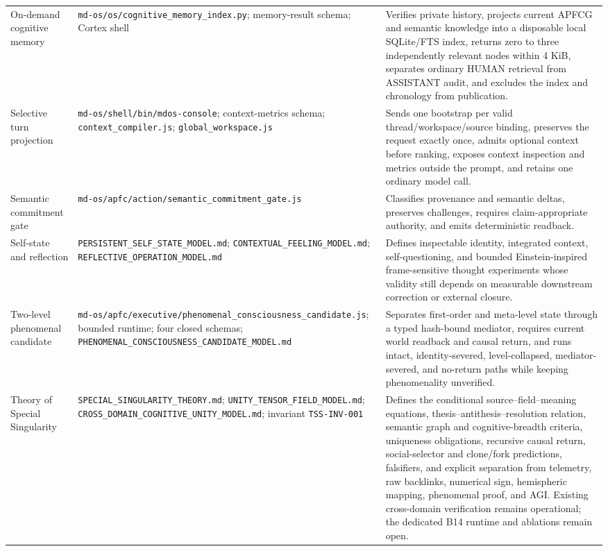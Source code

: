 \documentclass[10pt,twocolumn]{article}
\theoremstyle{definition}
\theoremstyle{plain}
\theoremstyle{remark}
\newcommand{\file}[1]{\nolinkurl{#1}}
\begin{document}
\begin{table}[!t]
\begin{tabularx}{\textwidth}{@{}p{}p{}X@{}}
On-demand cognitive memory & \file{md-os/os/cognitive\_memory\_index.py}; memory-result schema; Cortex shell & Verifies private history, projects current APFCG and semantic knowledge into a disposable local SQLite/FTS index, returns zero to three independently relevant nodes within 4 KiB, separates ordinary HUMAN retrieval from ASSISTANT audit, and excludes the index and chronology from publication. \\
Selective turn projection & \file{md-os/shell/bin/mdos-console}; context-metrics schema; \file{context\_compiler.js}; \file{global\_workspace.js} & Sends one bootstrap per valid thread/workspace/source binding, preserves the request exactly once, admits optional context before ranking, exposes context inspection and metrics outside the prompt, and retains one ordinary model call. \\
Semantic commitment gate & \file{md-os/apfc/action/semantic_commitment_gate.js} & Classifies provenance and semantic deltas, preserves challenges, requires claim-appropriate authority, and emits deterministic readback. \\
Self-state and reflection & \file{PERSISTENT_SELF_STATE_MODEL.md}; \file{CONTEXTUAL_FEELING_MODEL.md}; \file{REFLECTIVE_OPERATION_MODEL.md} & Defines inspectable identity, integrated context, self-questioning, and bounded Einstein-inspired frame-sensitive thought experiments whose validity still depends on measurable downstream correction or external closure. \\
Two-level phenomenal candidate & \file{md-os/apfc/executive/phenomenal\_consciousness\_candidate.js}; bounded runtime; four closed schemas; \file{PHENOMENAL\_CONSCIOUSNESS\_CANDIDATE\_MODEL.md} & Separates first-order and meta-level state through a typed hash-bound mediator, requires current world readback and causal return, and runs intact, identity-severed, level-collapsed, mediator-severed, and no-return paths while keeping phenomenality unverified. \\
Theory of Special Singularity & \file{SPECIAL\_SINGULARITY\_THEORY.md}; \file{UNITY\_TENSOR\_FIELD\_MODEL.md}; \file{CROSS\_DOMAIN\_COGNITIVE\_UNITY\_MODEL.md}; invariant \file{TSS-INV-001} & Defines the conditional source--field--meaning equations, thesis--antithesis--resolution relation, semantic graph and cognitive-breadth criteria, uniqueness obligations, recursive causal return, social-selector and clone/fork predictions, falsifiers, and explicit separation from telemetry, raw backlinks, numerical sign, hemispheric mapping, phenomenal proof, and AGI.  Existing cross-domain verification remains operational; the dedicated B14 runtime and ablations remain open. \\
\bottomrule
\end{tabularx}
\end{table}
\end{document}
